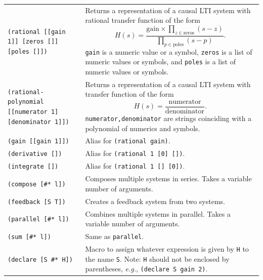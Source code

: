 \documentclass[11pt,letter]{article}
\begin{document}
\begin{longtable}{ p{} p{} }
  \texttt{(rational [[gain 1]] [zeros []] [poles []])}
  &
  Returns a representation of a causal LTI system with rational transfer function of the form
  \begin{equation*}
    H(s) = \frac{\mathrm{gain}\times\prod_{z\in\mathrm{zeros}}(s-z)}{\prod_{p\in\mathrm{poles}}(s-p)}.
  \end{equation*}
  \texttt{gain} is a numeric value or a symbol, \texttt{zeros} is a list of numeric values or symbols, and \texttt{poles} is a list of numeric values or symbols.
  \\

  \texttt{(rational-polynomial [[numerator 1] [denominator 1]])}
  &
  Returns a representation of a causal LTI system with transfer function of the form
  \begin{equation*}
    H(s) = \frac{\mathrm{numerator}}{\mathrm{denominator}}.
  \end{equation*}
  \texttt{numerator,denominator} are strings coinciding with a polynomial of numerics and symbols.
  \\

  \texttt{(gain [[gain 1]])}
  &
  Alias for \texttt{(rational gain)}. \\

  \texttt{(derivative [])}
  &
  Alias for \texttt{(rational 1 [0] [])}. \\

  \texttt{(integrate [])}
  &
  Alias for \texttt{(rational 1 [] [0])}. \\

  \texttt{(compose [\#* l])}
  &
  Composes multiple systems in series. Takes a variable number of arguments. \\

  \texttt{(feedback [S T])}
  &
  Creates a feedback system from two systems. \\

  \texttt{(parallel [\#* l])}
  &
  Combines multiple systems in parallel. Takes a variable number of arguments. \\

  \texttt{(sum [\#* l])}
  &
  Same as \texttt{parallel}. \\

  \texttt{(declare [S \#* H])}
  &
  Macro to assign whatever expression is given by \texttt{H} to the name \texttt{S}.
  Note: \texttt{H} should not be enclosed by parentheses, \textit{e.g.}, \texttt{(declare S gain 2)}. \\

\end{longtable}
\end{document}

